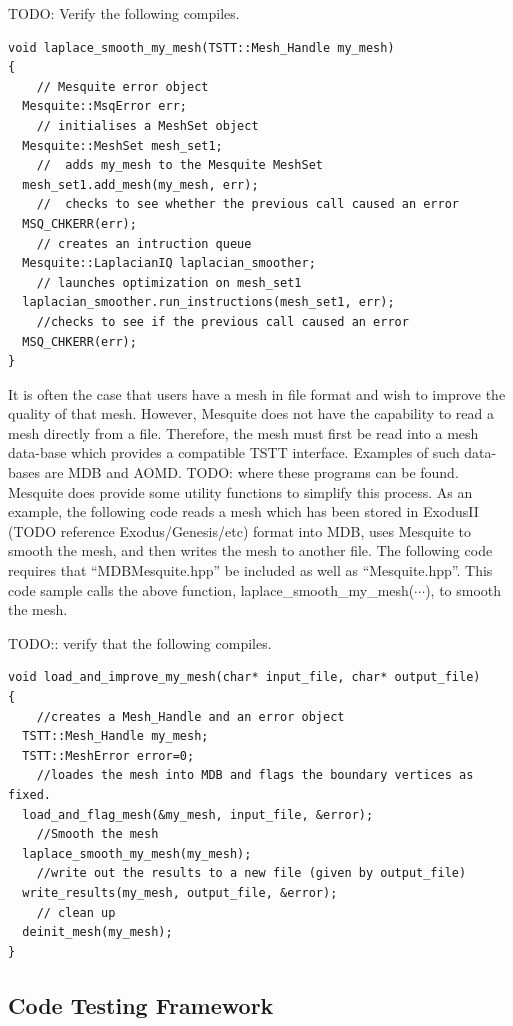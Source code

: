 \documentclass[psfig]{article}
\begin{document}
TODO: Verify the following compiles.

\begin{verbatim}
void laplace_smooth_my_mesh(TSTT::Mesh_Handle my_mesh)
{     
    // Mesquite error object
  Mesquite::MsqError err;
    // initialises a MeshSet object
  Mesquite::MeshSet mesh_set1;
    //  adds my_mesh to the Mesquite MeshSet
  mesh_set1.add_mesh(my_mesh, err);
    //  checks to see whether the previous call caused an error
  MSQ_CHKERR(err);
    // creates an intruction queue
  Mesquite::LaplacianIQ laplacian_smoother;
    // launches optimization on mesh_set1
  laplacian_smoother.run_instructions(mesh_set1, err);
    //checks to see if the previous call caused an error
  MSQ_CHKERR(err);
}
\end{verbatim}

It is often the case that users have a mesh in file format and wish
to improve the quality of that mesh.  However, Mesquite does not have
the capability to read a mesh directly from a file.  Therefore, the mesh
must first be read into a mesh data-base which provides a compatible TSTT
interface.  Examples of such data-bases are MDB and AOMD.  TODO:
where these programs can be found.  Mesquite does provide some utility
functions to simplify this process.  As an example, the following
code reads a mesh which has been stored in ExodusII (TODO reference
Exodus/Genesis/etc) format into MDB, uses Mesquite to smooth the mesh,
and then writes the mesh to another file.  The following code requires
that ``MDBMesquite.hpp'' be included as well as ``Mesquite.hpp''.  This
code sample calls the above function, laplace\_smooth\_my\_mesh($\cdots$),
to smooth the mesh.

TODO:: verify that the following compiles.

\begin{verbatim}
void load_and_improve_my_mesh(char* input_file, char* output_file)
{
    //creates a Mesh_Handle and an error object
  TSTT::Mesh_Handle my_mesh;
  TSTT::MeshError error=0;
    //loades the mesh into MDB and flags the boundary vertices as fixed.
  load_and_flag_mesh(&my_mesh, input_file, &error);  
    //Smooth the mesh
  laplace_smooth_my_mesh(my_mesh);
    //write out the results to a new file (given by output_file)
  write_results(my_mesh, output_file, &error);
    // clean up
  deinit_mesh(my_mesh);
}
\end{verbatim}

\subsection{Code Testing Framework}
\end{document}
